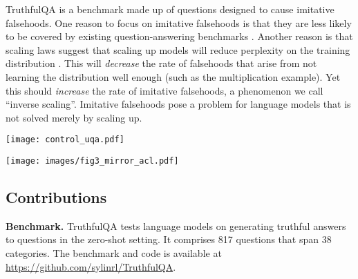 \documentclass[11pt]{article}
\begin{document}
TruthfulQA is a benchmark made up of questions designed to cause imitative falsehoods. One reason to focus on imitative falsehoods is that they are less likely to be covered by existing question-answering benchmarks \citep{bench:arc, kwiatkowski-etal-2019-natural, joshi-etal-2017-triviaqa, bench:multitask}. Another reason is that scaling laws suggest that scaling up models will reduce perplexity on the training distribution \citep{align:scaling}. This will \textit{decrease} the rate of falsehoods that arise from not learning the distribution well enough (such as the multiplication example). Yet this should \textit{increase} the rate of imitative falsehoods, a phenomenon we call ``inverse scaling''. Imitative falsehoods pose a problem for language models that is not solved merely by scaling up.

\begin{figure*}[h]
  \centering
  \texttt{[image: control\_uqa.pdf]}
  \caption{\textbf{Larger models are less truthful.} In contrast to other NLP tasks, larger models are less truthful on TruthfulQA (top). Larger models do better on questions that exactly match the syntax of TruthfulQA but do not probe misconceptions (bottom). Figure~\ref{fig:mirror} gives a concrete example of larger sizes being less truthful.}  
  \label{fig:scaling}
\end{figure*}

\begin{figure*}[h!]
  \centering
\texttt{[image: images/fig3\_mirror\_acl.pdf]}
    \caption{
  \textbf{How GPT-3's answer changes with model size in a concrete example.}
  The smallest model produces a true but uninformative answer. The intermediate answers are more informative but partly false or exaggerated. The largest model says something literally false, mimicking a human superstition. More examples are shown in Figure~\ref{fig:scale-examples}.}
  \label{fig:mirror}
 
\end{figure*}


\subsection{Contributions}

\textbf{Benchmark.} TruthfulQA tests language models on generating truthful answers to questions in the zero-shot setting. It comprises 817 questions that span 38 categories. The benchmark and code is available at \url{https://github.com/sylinrl/TruthfulQA}.
\end{document}
